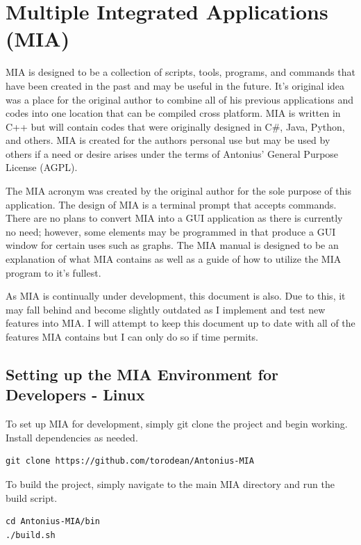\chapter{Multiple Integrated Applications (MIA)}
\pagestyle{fancy}

MIA is designed to be a collection of scripts, tools, programs, and commands that have been created in the past and may be useful in the future. It's original idea was a place for the original author to combine all of his previous applications and codes into one location that can be compiled cross platform. MIA is written in C++ but will contain codes that were originally designed in C\#, Java, Python, and others. MIA is created for the authors personal use but may be used by others if a need or desire arises under the terms of Antonius’ General Purpose License (AGPL). 

The MIA acronym was created by the original author for the sole purpose of this application. The design of MIA is a terminal prompt that accepts commands. There are no plans to convert MIA into a GUI application as there is currently no need; however, some elements may be programmed in that produce a GUI window for certain uses such as graphs. The MIA manual is designed to be an explanation of what MIA contains as well as a guide of how to utilize the MIA program to it's fullest. 

As MIA is continually under development, this document is also. Due to this, it may fall behind and become slightly outdated as I implement and test new features into MIA. I will attempt to keep this document up to date with all of the features MIA contains but I can only do so if time permits.

\section{Setting up the MIA Environment for Developers - Linux}

To set up MIA for development, simply git clone the project and begin working. Install dependencies as needed.

\begin{lstlisting}
git clone https://github.com/torodean/Antonius-MIA
\end{lstlisting}

To build the project, simply navigate to the main MIA directory and run the build script.

\begin{lstlisting}
cd Antonius-MIA/bin
./build.sh
\end{lstlisting}

